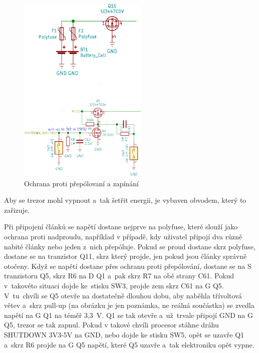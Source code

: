 \begin{figure}
    \centering
    \includegraphics[width=0.55\textwidth]{kapitoly/obrazky/E4/napajeni/ochrana_proti_prepolovani_a_zapinani.png}
    \caption{\label{fig:frog1}Ochrana proti přepólovaní a zapínání}
\end{figure} %
Aby se trezor mohl vypnout a~tak šetřit energii, je vybaven obvodem, který to zařizuje.

Při připojení článků se napětí dostane nejprve na polyfuse, %
které slouží jako ochrana proti nadproudu, například v případě, kdy uživatel připojí dva 
různě nabité články nebo jeden z~nich přepóluje.
Pokud se proud dostane skrz polyfuse, dostane se na tranzistor Q11, skrz který projde, jen pokud jsou články správně otočeny.
Když se napětí dostane přes ochranu proti přepólování, dostane se na S tranzistoru Q5, skrz R6 na D Q1 a~pak skrz R7 na obě strany C61.
Pokud v~takovéto situaci dojde ke~stisku SW3, projde zem skrz C61 na G Q5. V~tu~chvíli se Q5 otevře na dostatečně dlouhou dobu, 
aby naběhla třívoltová větev a~skrz pull-up (na obrázku je jen poznámka, ne reálná součástka) se zvedla napětí na G Q1 na téměř 3,3~V. 
Q1 se tak otevře a~už~trvale připojí GND na G Q5, trezor se tak zapnul. Pokud v takové chvíli procesor stáhne dráhu SHUTDOWN 3V3-5V 
na GND, nebo dojde ke stisku SW5, opět se uzavře Q1 a~skrz R6 projde na G Q5 napětí, které Q5 uzavře a~tak elektroniku opět vypne.

\newpage

